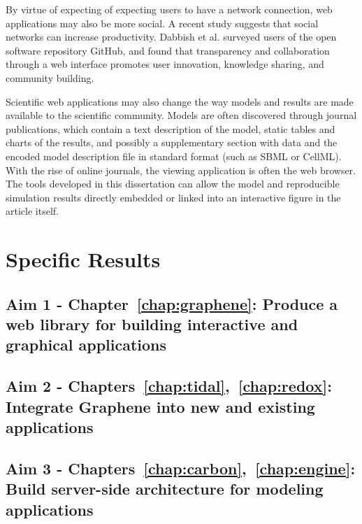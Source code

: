 By virtue of expecting of expecting users to have a network connection, web applications may also be more social.
A recent study \autocite{dabbish2012social} suggests that social networks can increase productivity.
Dabbish et al. surveyed users of the open software repository GitHub, and found that transparency and collaboration through a web interface promotes user innovation, knowledge sharing, and community building.

Scientific web applications may also change the way models and results are made available to the scientific community.
Models are often discovered through journal publications, which contain a text description of the model, static tables and charts of the results, and possibly a supplementary section with data and the encoded model description file in standard format (such as SBML or CellML).
With the rise of online journals, the viewing application is often the web browser.
The tools developed in this dissertation can allow the model and reproducible simulation results directly embedded or linked into an interactive figure in the article itself.

\section{Specific Results}
\subsection{Aim 1 - Chapter~\ref{chap:graphene}: Produce a web library for building interactive and graphical applications}
\subsection{Aim 2 - Chapters~\ref{chap:tidal},~\ref{chap:redox}: Integrate Graphene into new and existing applications}
\subsection{Aim 3 - Chapters~\ref{chap:carbon},~\ref{chap:engine}: Build server-side architecture for modeling applications}

